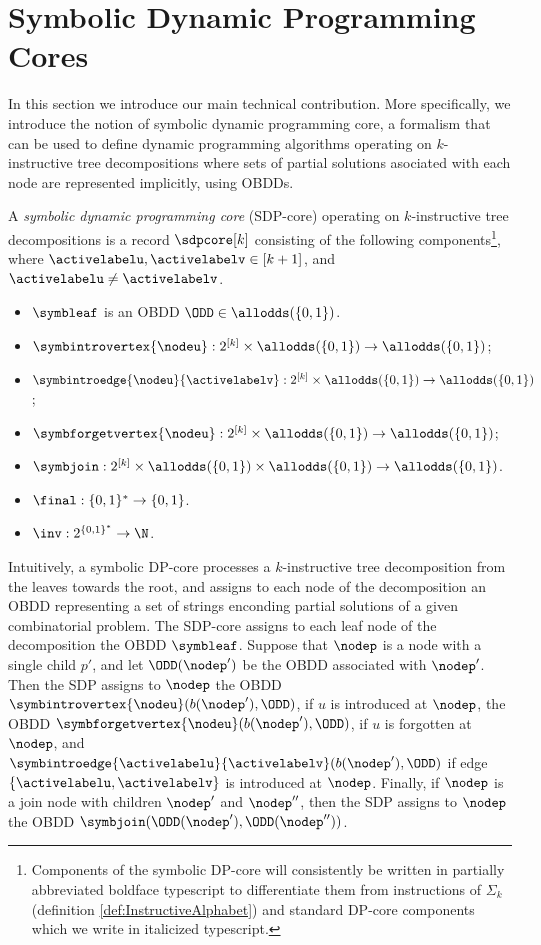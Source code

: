 \section{Symbolic Dynamic Programming Cores}
\label{SymbolicDPCores}

In this section we introduce our main technical contribution. More specifically, we introduce the notion of symbolic dynamic programming core, a formalism that can be used to define dynamic programming algorithms operating on $k$-instructive tree decompositions where sets of partial solutions asociated with each node are represented implicitly, using OBDDs. 

A {\em symbolic dynamic programming core} (SDP-core) operating on $k$-instructive tree decompositions is a record $\sdpcore[k]$ consisting of the following components\footnote{Components of the symbolic DP-core will consistently be written in partially abbreviated boldface typescript to differentiate them from instructions of $\Sigma_k$ (definition \ref{def:InstructiveAlphabet}) and standard DP-core components which we write in italicized typescript.}, where $\activelabelu,\activelabelv \in [k+1]$, and 
$\activelabelu\neq \activelabelv$. 

\begin{itemize}
    \item $\symbleaf$ is an OBDD $\ODD\in \allodds(\{0,1\})$. 
    \item $\symbintrovertex{\nodeu}:2^{[k]}\times  
    \allodds(\{0,1\})\rightarrow \allodds(\{0,1\})$;
    \item $\symbintroedge{\nodeu}{\activelabelv}:2^{[k]}\times\allodds(\{0,1\})\rightarrow \allodds(\{0,1\})$;
    \item $\symbforgetvertex{\nodeu}:2^{[k]}\times \allodds(\{0,1\})\rightarrow \allodds(\{0,1\})$;
    \item $\symbjoin:2^{[k]}\times \allodds(\{0,1\})\times 
    \allodds(\{0,1\})
    \rightarrow 
    \allodds(\{0,1\})$.
    \item $\final:\{0,1\}^*\rightarrow \{0,1\}$. 
    \item $\inv:2^{\{0,1\}^*}\rightarrow \N$. 
\end{itemize}


Intuitively, a symbolic DP-core processes a $k$-instructive tree decomposition from the leaves towards the root, and assigns to each node of the decomposition an OBDD representing a set of strings enconding partial solutions of a given combinatorial problem. The SDP-core assigns to each leaf node of the decomposition the OBDD $\symbleaf$. Suppose that $\nodep$ is a node with a single child $p'$, and let $\ODD(\nodep')$ be the OBDD associated with $\nodep'$. Then the SDP assigns to $\nodep$ the OBDD 
$\symbintrovertex{\nodeu}(b(\nodep'),\ODD)$, if $u$ is introduced at $\nodep$, the OBDD 
$\symbforgetvertex{\nodeu}(b(\nodep'),\ODD)$, if $u$ is forgotten at $\nodep$, and 
$\symbintroedge{\activelabelu}{\activelabelv}(b(\nodep'),\ODD)$ if edge $\{\activelabelu,\activelabelv\}$ is introduced at $\nodep$. Finally, if $\nodep$ is a join node with children $\nodep'$ and $\nodep''$, then the SDP assigns to $\nodep$ the OBDD 
$\symbjoin(\ODD(\nodep'),\ODD(\nodep''))$. 

